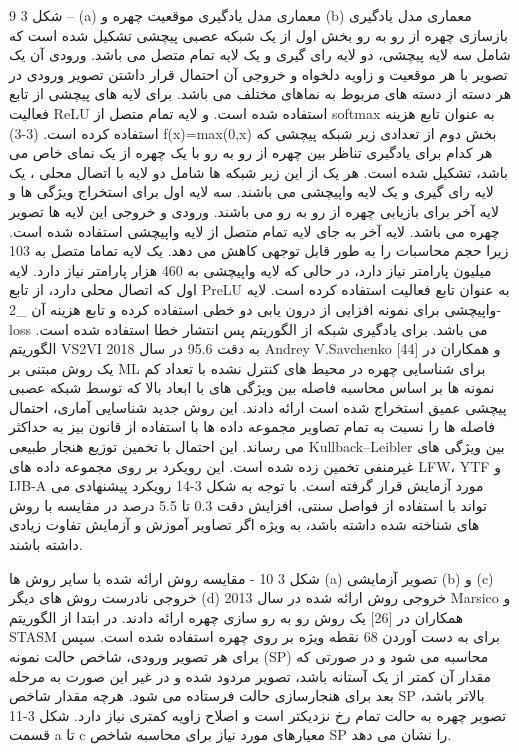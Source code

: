 شکل ‏3 9 – (a) معماری مدل یادگیری موقعیت چهره و (b) معماری مدل یادگیری بازسازی چهره از رو به رو
بخش اول از یک شبکه عصبی پیچشی تشکیل شده است که شامل سه لایه پیچشی، دو لایه رای گیری و یک لایه تمام متصل می باشد. ورودی آن یک تصویر با هر موقعیت و زاویه دلخواه و خروجی آن احتمال قرار داشتن تصویر ورودی در هر دسته از دسته های مربوط به نماهای مختلف می باشد. برای لایه های پیچشی از تابع فعالیت ReLU استفاده شده است. و لایه تمام متصل از softmax به عنوان تابع هزینه استفاده کرده است.
(3-3)	f(x)=max(0,x)	
بخش دوم از تعدادی زیر شبکه پیچشی که هر کدام برای یادگیری تناظر  بین چهره از رو به رو با یک چهره از یک نمای خاص می باشد، تشکیل شده است. هر یک از این زیر شبکه ها شامل دو لایه با اتصال محلی ، یک لایه رای گیری و یک لایه واپیچشی می باشند. سه لایه اول برای استخراج ویژگی ها و لایه آخر برای بازیابی چهره از رو به رو می باشند. ورودی و خروجی این لایه ها تصویر چهره می باشد.
لایه آخر به جای لایه تمام متصل از لایه واپیچشی استفاده شده است. زیرا حجم محاسبات را به طور قابل توجهی کاهش می دهد. یک لایه تماما متصل به 103 میلیون پارامتر نیاز دارد، در حالی که لایه واپیچشی به 460 هزار پارامتر نیاز دارد. لایه اول که اتصال محلی دارد،  از تابع PreLU به عنوان تابع فعالیت استفاده کرده است. لایه واپیچشی برای نمونه افزایی از درون یابی دو خطی استفاده کرده و تابع هزینه آن \ell_2-loss می باشد. برای یادگیری شبکه از الگوریتم پس انتشار خطا  استفاده شده است. الگوریتم VS2VI به دقت 95.6%
در سال 2018 Andrey V.Savchenko و همکاران در [44] یک روش مبتنی بر ML  برای شناسایی چهره در محیط های کنترل نشده با تعداد کم نمونه ها بر اساس محاسبه فاصله بین ویژگی های با ابعاد بالا که توسط شبکه عصبی پیچشی عمیق استخراج شده است ارائه دادند. این روش جدید شناسایی آماری، احتمال فاصله ها را نسبت به تمام تصاویر مجموعه داده ها با استفاده از قانون بیز  به حداکثر می رساند. این احتمال با تخمین توزیع هنجار طبیعی Kullback–Leibler بین ویژگی های غیرمنفی تخمین زده شده است. این رویکرد بر روی مجموعه داده های LFW، YTF  و IJB-A  مورد آزمایش قرار گرفته است. با توجه به شکل 3-14 رویکرد پیشنهادی می تواند با استفاده از فواصل سنتی، افزایش دقت 0.3 تا 5.5 درصد در مقایسه با روش های شناخته شده داشته باشد، به ویژه اگر تصاویر آموزش و آزمایش تفاوت زیادی داشته باشند. 
 
شکل ‏3 10 - مقایسه روش ارائه شده با سایر روش ها (a) تصویر آزمایشی (b) و (c) خروجی نادرست روش های دیگر (d) خروجی روش ارائه شده
در سال 2013 Marsico و همکاران در [26] یک روش رو به رو سازی چهره ارائه دادند. در ابتدا از الگوریتم STASM  برای به دست آوردن 68 نقطه ویژه بر روی چهره استفاده شده است. سپس برای هر تصویر ورودی، شاخص حالت نمونه  (SP) محاسبه می شود و در صورتی که مقدار آن کمتر از یک آستانه باشد، تصویر مردود شده و در غیر این صورت به مرحله بعد برای هنجارسازی حالت فرستاده می شود. هرچه مقدار شاخص SP بالاتر باشد، تصویر چهره به حالت تمام رخ نزدیکتر است و اصلاح زاویه کمتری نیاز دارد. شکل 3-11 قسمت a تا c معیارهای مورد نیاز برای محاسبه شاخص SP را نشان می دهد.
 
